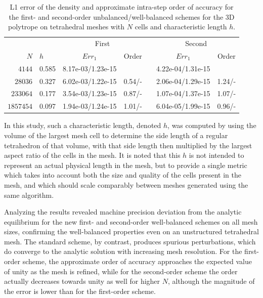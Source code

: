 \begin{table}\centering
\caption{L1 error of the density and approximate intra-step order of accuracy for the first- and second-order unbalanced/well-balanced schemes for the 3D polytrope on tetrahedral meshes with $N$ cells and characteristic length $h$.}
\label{table:polytrope}
\begin{tabular}{@{}rlccccc@{}}\toprule
&& \multicolumn{2}{c}{First} & & \multicolumn{2}{c}{Second}\\
\cmidrule{3-4} \cmidrule{6-7}
$N$ & \phantom{al}$h$ & $Err_1$ & Order && $Err_1$ & Order\\ \midrule
$4144$ & 0.585\phantom{a} & 8.17e-03/1.23e-15 &&& 4.22e-04/1.31e-15 &\\
$28036$ & 0.327 & 6.02e-03/1.22e-15 & 0.54/- && 2.06e-04/1.29e-15 & 1.24/-\\
$233064$ & 0.177 & 3.54e-03/1.23e-15 & 0.87/- && 1.07e-04/1.37e-15 & 1.07/-\\
$1857454$ & 0.097 & 1.94e-03/1.24e-15 & 1.01/- && 6.04e-05/1.99e-15 & 0.96/-\\
\bottomrule
\end{tabular}
\end{table}

In this study, such a characteristic length, denoted $h$, was computed by using the volume of the largest mesh cell to determine the side length of a regular tetrahedron of that volume, with that side length then multiplied by the largest aspect ratio of the cells in the mesh. It is noted that this $h$ is not intended to represent an actual physical length in the mesh, but to provide a single metric which takes into account both the size and quality of the cells present in the mesh, and which should scale comparably between meshes generated using the same algorithm.

Analyzing the results revealed machine precision deviation from the analytic equilibrium for the new first- and second-order well-balanced schemes on all mesh sizes, confirming the well-balanced properties even on an unstructured tetrahedral mesh. The standard scheme, by contrast, produces spurious perturbations, which do converge to the analytic solution with increasing mesh resolution. For the first-order scheme, the approximate order of accuracy approaches the expected value of unity as the mesh is refined, while for the second-order scheme the order actually decreases towards unity as well for higher $N$, although the magnitude of the error is lower than for the first-order scheme.

